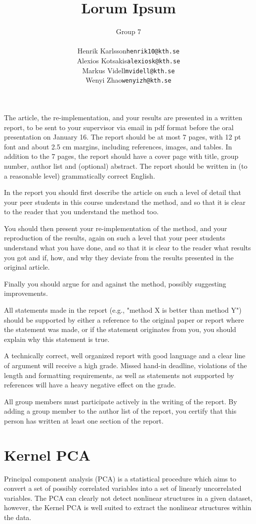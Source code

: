 \documentclass[12pt]{article}
\title{
	Lorum Ipsum
}
\author{
	Group 7\\
	\begin{tabular}{r l}
		Henrik Karlsson &\texttt{henrik10@kth.se} \\
		Alexios Kotsakis &\texttt{alexiosk@kth.se}\\
		Markus Videll &\texttt{mvidell@kth.se}\\
		Wenyi Zhao &\texttt{wenyizh@kth.se}
	\end{tabular}
}
\begin{document}
	\maketitle
	The article, the re-implementation, and your results are presented in a written report, to be sent to your supervisor via email in pdf format before the oral presentation on January 16. The report should be at most 7 pages, with 12 pt font and about 2.5 cm margins, including references, images, and tables. In addition to the 7 pages, the report should have a cover page with title, group number, author list and (optional) abstract. The report should be written in (to a reasonable level) grammatically correct English.
	
	In the report you should first describe the article on such a level of detail that your peer students in this course understand the method, and so that it is clear to the reader that you understand the method too.
	
	You should then present your re-implementation of the method, and your reproduction of the results, again on such a level that your peer students understand what you have done, and so that it is clear to the reader what results you got and if, how, and why they deviate from the results presented in the original article.
	
	Finally you should argue for and against the method, possibly suggesting improvements.
	
	All statements made in the report (e.g., "method X is better than method Y") should be supported by either a reference to the original paper or report where the statement was made, or if the statement originates from you, you should explain why this statement is true.
	
	A technically correct, well organized report with good language and a clear line of argument will receive a high grade. Missed hand-in deadline, violations of the length and formatting requirements, as well as statements not supported by references will have a heavy negative effect on the grade.
	
	All group members must participate actively in the writing of the report. By adding a group member to the author list of the report, you certify that this person has written at least one section of the report.
	\newpage
	\section{Kernel PCA}
	Principal component analysis (PCA) is a statistical procedure which aims to convert a set of possibly correlated variables into a set of linearly uncorrelated variables. The PCA can clearly not detect nonlinear structures in a given dataset, however, the Kernel PCA is well suited to extract the nonlinear structures within the data. 
	
\end{document}
